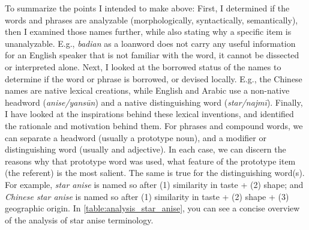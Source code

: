
To summarize the points I intended to make above: First, I determined if the words and phrases are analyzable (morphologically, syntactically, semantically), then I examined those names further, while also stating why a specific item is unanalyzable. E.g., \textit{badian} as a loanword does not carry any useful information for an English speaker that is not familiar with the word, it cannot be dissected or interpreted alone. Next, I looked at the borrowed status of the names to determine if the word or phrase is borrowed, or devised locally. E.g., the Chinese names are native lexical creations, while English and Arabic use a non-native headword (\textit{anise/yansūn}) and a native distinguishing word (\textit{star/najmī}). Finally, I have looked at the inspirations behind these lexical inventions, and identified the rationale and motivation behind them. For phrases and compound words, we can separate a headword (usually a prototype noun), and a modifier or distinguishing word (usually and adjective). In each case, we can discern the reasons why that prototype word was used, what feature of the prototype item (the referent) is the most salient. The same is true for the distinguishing word(s). For example, \textit{star anise} is named so after (1) similarity in taste + (2) shape; and \textit{Chinese star anise} is named so after (1) similarity in taste + (2) shape + (3) geographic origin. In \cref{table:analysis_star_anise}, you can see a concise overview of the analysis of star anise terminology.

